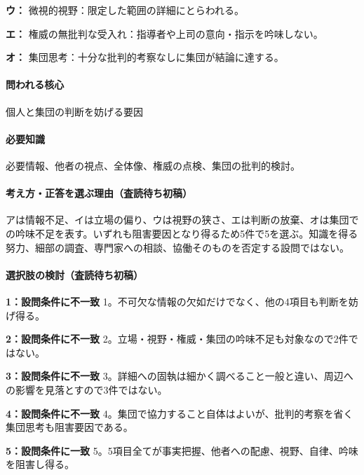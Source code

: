 \noindent\textbf{ウ：} 微視的視野：限定した範囲の詳細にとらわれる。\par

\noindent\textbf{エ：} 権威の無批判な受入れ：指導者や上司の意向・指示を吟味しない。\par

\noindent\textbf{オ：} 集団思考：十分な批判的考察なしに集団が結論に達する。\par

\paragraph{問われる核心} 個人と集団の判断を妨げる要因

\paragraph{必要知識} 必要情報、他者の視点、全体像、権威の点検、集団の批判的検討。

\paragraph{考え方・正答を選ぶ理由（査読待ち初稿）} アは情報不足、イは立場の偏り、ウは視野の狭さ、エは判断の放棄、オは集団での吟味不足を表す。いずれも阻害要因となり得るため5件で5を選ぶ。知識を得る努力、細部の調査、専門家への相談、協働そのものを否定する設問ではない。

\paragraph{選択肢の検討（査読待ち初稿）}\mbox{}\par

\noindent\textbf{1：設問条件に不一致} 1。不可欠な情報の欠如だけでなく、他の4項目も判断を妨げ得る。\par

\noindent\textbf{2：設問条件に不一致} 2。立場・視野・権威・集団の吟味不足も対象なので2件ではない。\par

\noindent\textbf{3：設問条件に不一致} 3。詳細への固執は細かく調べること一般と違い、周辺への影響を見落とすので3件ではない。\par

\noindent\textbf{4：設問条件に不一致} 4。集団で協力すること自体はよいが、批判的考察を省く集団思考も阻害要因である。\par

\noindent\textbf{5：設問条件に一致} 5。5項目全てが事実把握、他者への配慮、視野、自律、吟味を阻害し得る。\par

